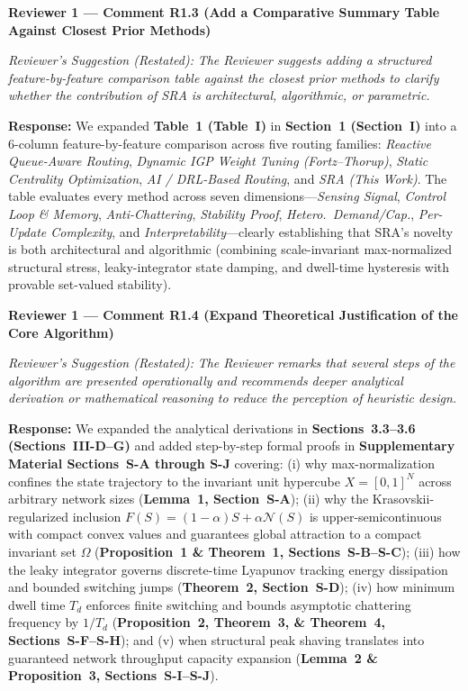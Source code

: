 \documentclass[11pt,a4paper]{article}
\newcommand{\cbox}[2]{%
  \vspace{0.6em}\noindent\textbf{#1}\par\smallskip
  \noindent\textit{Reviewer's Suggestion (Restated):} \textit{#2}\par\smallskip
}
\begin{document}
\cbox{Reviewer 1 --- Comment R1.3 (Add a Comparative Summary Table Against Closest Prior Methods)}{The Reviewer suggests adding a structured feature-by-feature comparison table against the closest prior methods to clarify whether the contribution of SRA is architectural, algorithmic, or parametric.}

\noindent\textbf{Response:} We expanded \textbf{Table~1 (Table~I)} in \textbf{Section~1 (Section~I)} into a 6-column feature-by-feature comparison across five routing families: \textit{Reactive Queue-Aware Routing}, \textit{Dynamic IGP Weight Tuning (Fortz--Thorup)}, \textit{Static Centrality Optimization}, \textit{AI / DRL-Based Routing}, and \textit{SRA (This Work)}. The table evaluates every method across seven dimensions---\textit{Sensing Signal}, \textit{Control Loop \& Memory}, \textit{Anti-Chattering}, \textit{Stability Proof}, \textit{Hetero.\ Demand/Cap.}, \textit{Per-Update Complexity}, and \textit{Interpretability}---clearly establishing that SRA's novelty is both architectural and algorithmic (combining scale-invariant max-normalized structural stress, leaky-integrator state damping, and dwell-time hysteresis with provable set-valued stability).

\hrulefill

\cbox{Reviewer 1 --- Comment R1.4 (Expand Theoretical Justification of the Core Algorithm)}{The Reviewer remarks that several steps of the algorithm are presented operationally and recommends deeper analytical derivation or mathematical reasoning to reduce the perception of heuristic design.}

\noindent\textbf{Response:} We expanded the analytical derivations in \textbf{Sections~3.3--3.6 (Sections~III-D--G)} and added step-by-step formal proofs in \textbf{Supplementary Material Sections~S-A through S-J} covering: (i) why max-normalization confines the state trajectory to the invariant unit hypercube $X=[0,1]^N$ across arbitrary network sizes (\textbf{Lemma~1, Section~S-A}); (ii) why the Krasovskii-regularized inclusion $F(S)=(1-\alpha)S+\alpha\mathcal{N}(S)$ is upper-semicontinuous with compact convex values and guarantees global attraction to a compact invariant set $\Omega$ (\textbf{Proposition~1 \& Theorem~1, Sections~S-B--S-C}); (iii) how the leaky integrator governs discrete-time Lyapunov tracking energy dissipation and bounded switching jumps (\textbf{Theorem~2, Section~S-D}); (iv) how minimum dwell time $T_d$ enforces finite switching and bounds asymptotic chattering frequency by $1/T_d$ (\textbf{Proposition~2, Theorem~3, \& Theorem~4, Sections~S-F--S-H}); and (v) when structural peak shaving translates into guaranteed network throughput capacity expansion (\textbf{Lemma~2 \& Proposition~3, Sections~S-I--S-J}).
\end{document}

